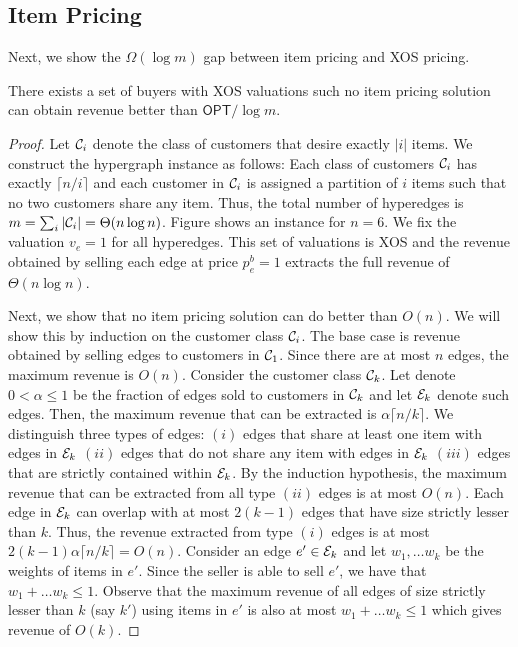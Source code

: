 \subsection{Item Pricing}

Next, we show the $\Omega(\log m)$ gap between item pricing and XOS pricing.

\begin{lemma}
	There exists a set of buyers with XOS valuations such no item pricing solution can obtain revenue better than $\textsf{OPT}/ \log m$.
\end{lemma}
\begin{proof}
	Let $\mathcal{C}_i$ denote the class of customers that desire exactly $\vert i \vert$ items. We construct the hypergraph instance as follows: Each class of customers $\mathcal{C}_i$ has exactly $\lceil n/i \rceil$ and each customer in $\mathcal{C}_i$ is assigned a partition of $i$ items such that no two customers share any item. Thus, the total number of hyperedges is $m = \sum_{i} \vert \mathcal{C}_i \vert = \Theta( n \log n)$. Figure shows  an instance for $n=6$. We fix the valuation $v_e = 1$ for all hyperedges. This set of valuations is XOS and the revenue obtained by selling each edge at price $p^{b}_e = 1$ extracts the full revenue of $\Theta(n \log n)$.
	
	Next, we show that no item pricing solution can do better than $O(n)$. We will show this by induction on the customer class $\mathcal{C}_i$. The base case is revenue obtained by selling edges to customers in $\mathcal{C}_1$. Since there are at most $n$ edges, the maximum revenue is $O(n)$. Consider the customer class $\mathcal{C}_k$. Let denote $0 < \alpha \leq 1$ be the fraction of edges sold to customers in $\mathcal{C}_k$ and let $\mathcal{E}_k$ denote such edges. Then, the maximum revenue that can be extracted is $\alpha \lceil n/k \rceil$. We distinguish three types of edges: $(i)$ edges that share at least one item with edges in $\mathcal{E}_k$ $(ii)$ edges that do not share any item with edges in $\mathcal{E}_k$ $(iii)$ edges that are strictly contained within $\mathcal{E}_k$. By the induction hypothesis, the maximum revenue that can be extracted from all type $(ii)$ edges is at most $O(n)$. Each edge in $\mathcal{E}_k$ can overlap with at most $2(k-1)$ edges that have size strictly lesser than $k$. Thus, the revenue extracted from type $(i)$ edges is at most $2(k-1) \alpha \lceil n/k \rceil = O(n)$. Consider an edge $e' \in \mathcal{E}_k$ and let $w_1, \dots w_k$ be the weights of items in $e'$. Since the seller is able to sell $e'$, we have that $w_1 + \dots w_k \leq 1$. Observe that the maximum revenue of all edges of size strictly lesser than $k$ (say $k'$) using items in $e'$ is also at most $w_1 + \dots w_k \leq 1$ which gives revenue of $O(k)$. 
\end{proof}

